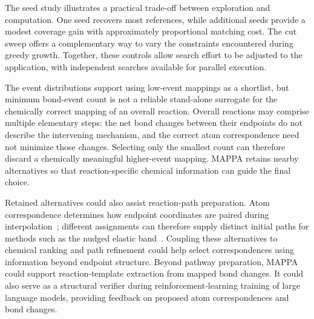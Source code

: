The seed study illustrates a practical trade-off between exploration and computation. One seed recovers most references, while additional seeds provide a modest coverage gain with approximately proportional matching cost. The cut sweep offers a complementary way to vary the constraints encountered during greedy growth. Together, these controls allow search effort to be adjusted to the application, with independent searches available for parallel execution.

The event distributions support using low-event mappings as a shortlist, but minimum bond-event count is not a reliable stand-alone surrogate for the chemically correct mapping of an overall reaction. Overall reactions may comprise multiple elementary steps: the net bond changes between their endpoints do not describe the intervening mechanism, and the correct atom correspondence need not minimize those changes. Selecting only the smallest count can therefore discard a chemically meaningful higher-event mapping. MAPPA retains nearby alternatives so that reaction-specific chemical information can guide the final choice.

Retained alternatives could also assist reaction-path preparation. Atom correspondence determines how endpoint coordinates are paired during interpolation~\citep{de2019}; different assignments can therefore supply distinct initial paths for methods such as the nudged elastic band~\citep{henkelman2000}. Coupling these alternatives to chemical ranking and path refinement could help select correspondences using information beyond endpoint structure. Beyond pathway preparation, MAPPA could support reaction-template extraction from mapped bond changes. It could also serve as a structural verifier during reinforcement-learning training of large language models, providing feedback on proposed atom correspondences and bond changes.
